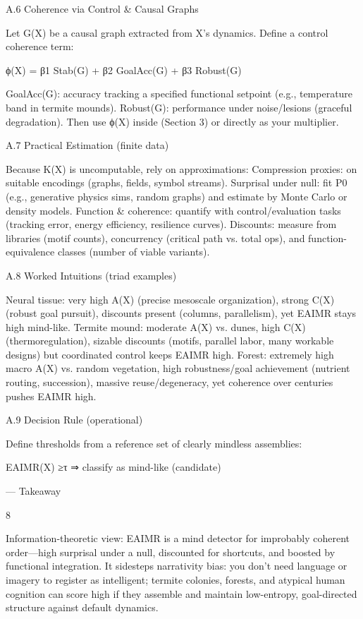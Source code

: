 \documentclass{article}
\begin{document}
A.6
Coherence via Control & Causal Graphs

Let G(X) be a causal graph extracted from X’s dynamics. Define a control coherence term:

ϕ(X) = β1 Stab(G) + β2 GoalAcc(G) + β3 Robust(G)

GoalAcc(G): accuracy tracking a specified functional setpoint (e.g., temperature band in termite mounds).
Robust(G): performance under noise/lesions (graceful degradation).
Then use ϕ(X) inside (Section 3) or directly as your multiplier.

A.7
Practical Estimation (finite data)

Because K(X) is uncomputable, rely on approximations:
Compression proxies: on suitable encodings (graphs, fields, symbol streams).
Surprisal under null: fit P0 (e.g., generative physics sims, random graphs) and estimate by Monte Carlo
or density models.
Function & coherence: quantify with control/evaluation tasks (tracking error, energy efficiency, resilience
curves).
Discounts: measure from libraries (motif counts), concurrency (critical path vs. total ops), and function-
equivalence classes (number of viable variants).

A.8
Worked Intuitions (triad examples)

Neural tissue: very high A(X) (precise mesoscale organization), strong C(X) (robust goal pursuit), discounts
present (columns, parallelism), yet EAIMR stays high mind-like.
Termite mound: moderate A(X) vs. dunes, high C(X) (thermoregulation), sizable discounts (motifs,
parallel labor, many workable designs) but coordinated control keeps EAIMR high.
Forest: extremely high macro A(X) vs. random vegetation, high robustness/goal achievement (nutrient
routing, succession), massive reuse/degeneracy, yet coherence over centuries pushes EAIMR high.

A.9
Decision Rule (operational)

Define thresholds from a reference set of clearly mindless assemblies:

EAIMR(X) ≥τ
⇒
classify as mind-like (candidate)

—
Takeaway

8

Information-theoretic view: EAIMR is a mind detector for improbably coherent order—high surprisal
under a null, discounted for shortcuts, and boosted by functional integration.
It sidesteps narrativity bias: you don’t need language or imagery to register as intelligent; termite colonies,
forests, and atypical human cognition can score high if they assemble and maintain low-entropy, goal-directed
structure against default dynamics.
\end{document}
